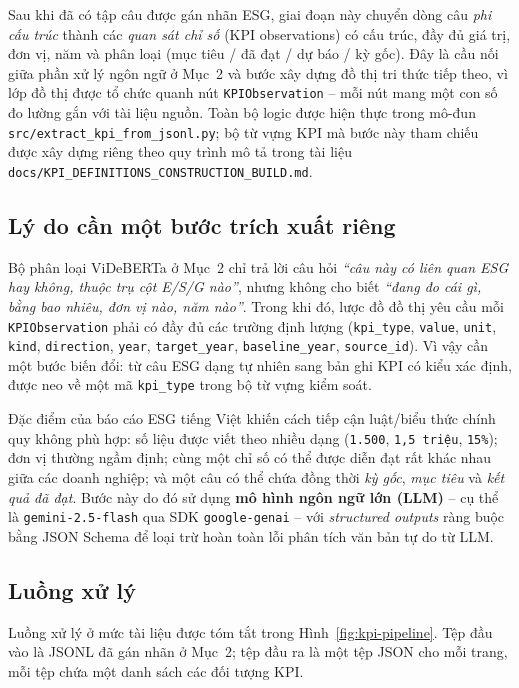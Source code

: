 \documentclass{article}
\begin{document}
Sau khi đã có tập câu được gán nhãn ESG, giai đoạn này chuyển dòng câu \textit{phi
cấu trúc} thành các \textit{quan sát chỉ số} (KPI observations) có cấu trúc, đầy đủ
giá trị, đơn vị, năm và phân loại (mục tiêu / đã đạt / dự báo / kỳ gốc). Đây là
cầu nối giữa phần xử lý ngôn ngữ ở Mục~2 và bước xây dựng đồ thị tri thức tiếp
theo, vì lớp đồ thị được tổ chức quanh nút \texttt{KPIObservation} -- mỗi nút
mang một con số đo lường gắn với tài liệu nguồn. Toàn bộ logic được hiện thực
trong mô-đun \texttt{src/extract\_kpi\_from\_jsonl.py}; bộ từ vựng KPI mà bước
này tham chiếu được xây dựng riêng theo quy trình mô tả trong tài liệu
\texttt{docs/KPI\_DEFINITIONS\_CONSTRUCTION\_BUILD.md}.

\subsection{Lý do cần một bước trích xuất riêng}

Bộ phân loại ViDeBERTa ở Mục~2 chỉ trả lời câu hỏi \textit{``câu này có liên quan
ESG hay không, thuộc trụ cột E/S/G nào''}, nhưng không cho biết \textit{``đang
đo cái gì, bằng bao nhiêu, đơn vị nào, năm nào''}. Trong khi đó, lược đồ đồ thị
yêu cầu mỗi \texttt{KPIObservation} phải có đầy đủ các trường định lượng
(\texttt{kpi\_type}, \texttt{value}, \texttt{unit}, \texttt{kind},
\texttt{direction}, \texttt{year}, \texttt{target\_year}, \texttt{baseline\_year},
\texttt{source\_id}). Vì vậy cần một bước biến đổi: từ câu ESG dạng tự nhiên
sang bản ghi KPI có kiểu xác định, được neo về một mã \texttt{kpi\_type} trong
bộ từ vựng kiểm soát.

Đặc điểm của báo cáo ESG tiếng Việt khiến cách tiếp cận luật/biểu thức chính quy
không phù hợp: số liệu được viết theo nhiều dạng (\texttt{1.500}, \texttt{1,5
triệu}, \texttt{15\%}); đơn vị thường ngầm định; cùng một chỉ số có thể được
diễn đạt rất khác nhau giữa các doanh nghiệp; và một câu có thể chứa đồng thời
\textit{kỳ gốc}, \textit{mục tiêu} và \textit{kết quả đã đạt}. Bước này do đó
sử dụng \textbf{mô hình ngôn ngữ lớn (LLM)} -- cụ thể là \texttt{gemini-2.5-flash}
qua SDK \texttt{google-genai} -- với \textit{structured outputs} ràng buộc bằng
JSON Schema để loại trừ hoàn toàn lỗi phân tích văn bản tự do từ LLM.

\subsection{Luồng xử lý}

Luồng xử lý ở mức tài liệu được tóm tắt trong Hình~\ref{fig:kpi-pipeline}.
Tệp đầu vào là JSONL đã gán nhãn ở Mục~2; tệp đầu ra là một tệp JSON cho mỗi
trang, mỗi tệp chứa một danh sách các đối tượng KPI.
\end{document}
